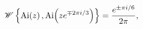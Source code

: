 \[\mathop{\mathscr{W}\/}\nolimits\left\{\mathop{\mathrm{Ai}\/}\nolimits\!\left(z%
\right),\mathop{\mathrm{Ai}\/}\nolimits\!\left(ze^{\mp 2\pi i/3}\right)\right%
\}=\frac{e^{\pm\pi i/6}}{2\pi},\]